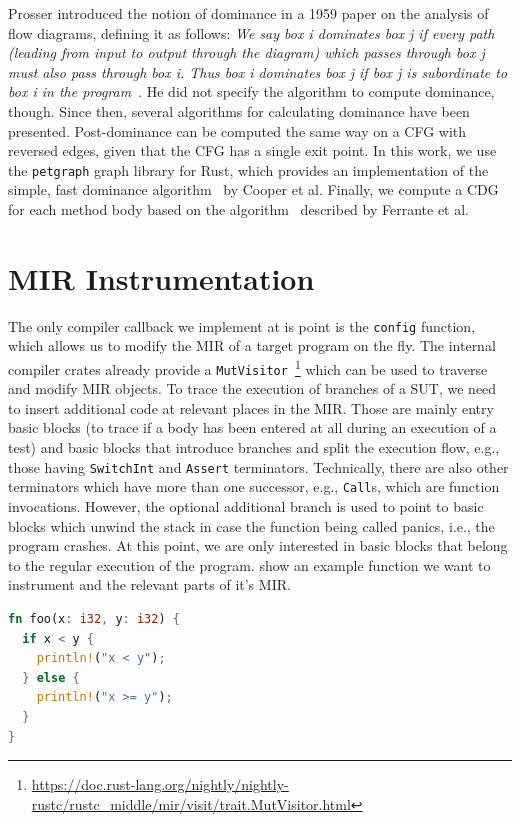 \documentclass[paper=a4,%
  twoside,%
  BCOR4mm,%
  abstract=true,%
  toc=bibliography,%
  chapterprefix=true,%
  toc=bibliographynumbered,%
  open=right,%
  english,%
  pagesize=pdftex]{scrreprt}
\begin{document}
Prosser introduced the notion of dominance in a 1959 paper on the analysis of flow diagrams, defining it as follows:
\textit{We say box i dominates box j if every path (leading from input to output through the diagram) which passes through box j must also pass through box i. Thus box i dominates box j if box j is subordinate to box i in the program}~\cite{Prosser1959}. He did not specify the algorithm to compute dominance, though. Since then, several algorithms for calculating dominance have been presented. Post-dominance can be computed the same way on a \ac{CFG} with reversed edges, given that the \ac{CFG} has a single exit point. In this work, we use the \lstinline{petgraph} graph library for Rust, which provides an implementation of the simple, fast dominance algorithm~\cite{Cooper2001} by Cooper et al. Finally, we compute a \ac{CDG} for each method body based on the algorithm~\cite{Ferrante1987} described by Ferrante et al.

\section{MIR Instrumentation}
The only compiler callback we implement at is point is the \lstinline{config} function, which allows us to modify the \ac{MIR} of a target program on the fly. The internal compiler crates already provide a \lstinline{MutVisitor}~\footnote{\url{https://doc.rust-lang.org/nightly/nightly-rustc/rustc_middle/mir/visit/trait.MutVisitor.html}} which can be used to traverse and modify \ac{MIR} objects. To trace the execution of branches of a \ac{SUT}, we need to insert additional code at relevant places in the \ac{MIR}. Those are mainly entry basic blocks (to trace if a body has been entered at all during an execution of a test) and basic blocks that introduce branches and split the execution flow, e.g., those having \lstinline{SwitchInt} and \lstinline{Assert} terminators. Technically, there are also other terminators which have more than one successor, e.g., \lstinline{Call}s, which are function invocations. However, the optional additional branch is used to point to basic blocks which unwind the stack in case the function being called panics, i.e., the program crashes. At this point, we are only interested in basic blocks that belong to the regular execution of the program.  show an example function we want to instrument and the relevant parts of it's \ac{MIR}.

\begin{lstlisting}[language=Rust, style=boxed, caption={Example function to instrument}, label=lst:example-function-to-instrument]
fn foo(x: i32, y: i32) {
  if x < y {
    println!("x < y");
  } else {
    println!("x >= y");
  }
}
\end{lstlisting}
\end{document}
